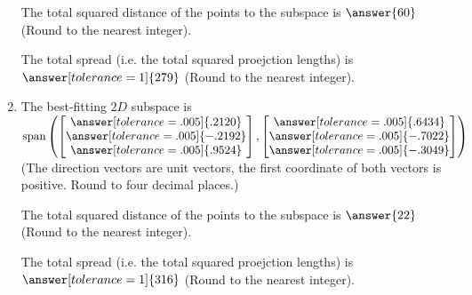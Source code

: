 \documentclass{ximera}
\begin{document}
\begin{problem}
\begin{solution}
\begin{enumerate}
      The total squared distance of the points to the subspace is $\answer{60}$ (Round to the nearest integer).

      The total spread (i.e. the total squared proejction lengths) is $\answer[tolerance=1]{279}$ (Round to the nearest integer).

      \item The best-fitting $2D$ subspace is $\text{span}\left(\begin{bmatrix}
        \answer[tolerance=.005]{.2120}\\\answer[tolerance=.005]{-.2192}\\\answer[tolerance=.005]{.9524}
      \end{bmatrix},\begin{bmatrix}
        \answer[tolerance=.005]{.6434}\\\answer[tolerance=.005]{-.7022}\\\answer[tolerance=.005]{-.3049}
      \end{bmatrix}\right)$ (The direction vectors are unit vectors, the first coordinate of both vectors is positive. Round to four decimal places.)

      The total squared distance of the points to the subspace is $\answer{22}$ (Round to the nearest integer).

      The total spread (i.e. the total squared proejction lengths) is $\answer[tolerance=1]{316}$ (Round to the nearest integer).
    \end{enumerate}

  \end{solution}

\end{problem}

\end{document}
